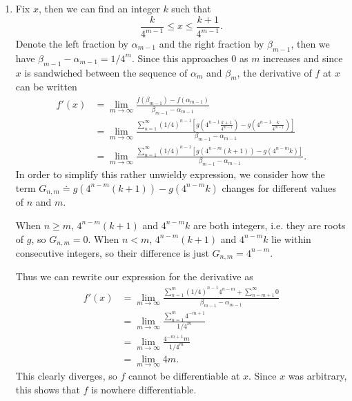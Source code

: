 \documentclass[10pt]{amsart}
\begin{document}
\begin{enumerate}
	\item Fix $x$, then we can find an integer $k$ such that
		 \[
			 \frac{k}{4^{m-1}} \leq x \leq \frac{k+1}{4^{m-1}} .
		 \] Denote the left fraction by $\alpha_{m-1}$ and the right fraction by $\beta_{m-1}$, then we have $\beta_{m-1}-\alpha_{m-1}=1/4^m$. Since this approaches 0 as $m$ increases and since $x$ is sandwiched between the sequence of $\alpha_m$ and $\beta_m$, the derivative of $f$ at $x$ can be written
		 \begin{align*}
			 f'(x) &= \lim_{m \to \infty} \frac{f(\beta_{m-1}) - f(\alpha_{m-1})}{\beta_{m-1}-\alpha_{m-1}} \\
			       &= \lim_{m \to \infty} \frac{\sum_{n=1}^{\infty} \left( 1/4 \right)^{n-1} \left[ g(4^{n-1} \frac{k+1}{4^{m-1}}) - g(4^{n-1} \frac{k}{4^{m-1}} ) \right]}{\beta_{m-1} - \alpha_{m-1}} \\
			       &= \lim_{m \to \infty} \frac{\sum_{n=1}^{\infty} (1/4)^{n-1} \left[ g(4^{n-m} (k+1)) - g(4^{n-m} k) \right]}{\beta_{m-1} - \alpha_{m-1}}.
		 \end{align*} In order to simplify this rather unwieldy expression, we consider how the term $G_{n,m} \doteq g(4^{n-m} (k+1)) - g(4^{n-m} k)$ changes for different values of $n$ and $m$.

		 When $n \geq m$, $4^{n-m} (k+1)$ and $4^{n-m} k$ are both integers, i.e. they are roots of $g$, so $G_{n,m}=0$. When $n < m$, $4^{n-m} (k+1)$ and $4^{n-m} k$ lie within consecutive integers, so their difference is just $G_{n,m}= 4^{n-m}$.

		 Thus we can rewrite our expression for the derivative as
		 \begin{align*}
			 f'(x) &= \lim_{m \to \infty} \frac{\sum_{n=1}^{m}(1/4)^{n-1} 4^{n-m} + \sum_{n=m+1}^{\infty} 0}{\beta_{m-1} - \alpha_{m-1}} \\
			       &= \lim_{m \to \infty} \frac{ \sum_{n=1}^{m} 4^{-m+1}}{1/4^m} \\
			       &= \lim_{m \to \infty} \frac{4^{-m+1}m}{1/4^m} \\
			       &= \lim_{m \to \infty} 4m.
		 \end{align*}
		 This clearly diverges, so $f$ cannot be differentiable at $x$. Since $x$ was arbitrary, this shows that $f$ is nowhere differentiable.

\end{enumerate}
\end{document}
